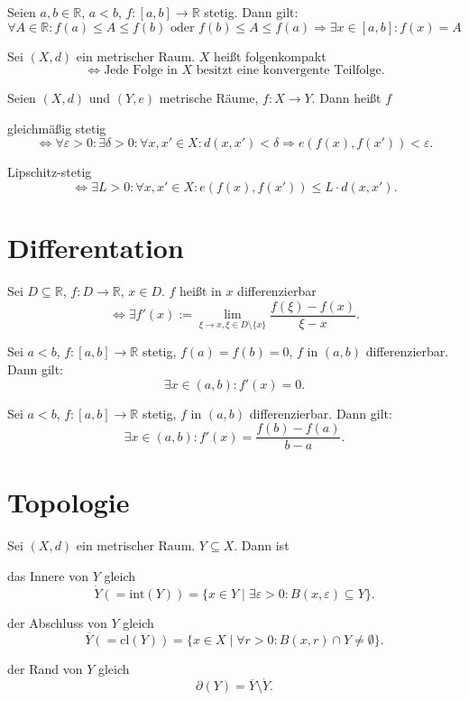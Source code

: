 \documentclass[]{scrartcl}
\newcommand{\R}{\ensuremath{\mathbb{R}}}
\begin{document}
\begin{satz}[Zwischenwertsatz]
Seien $a,b\in\R$, $a<b$, $f\colon \left[a,b\right]\to\R$ stetig. Dann gilt:
\[\forall A\in\R\colon f(a)\leq A\leq f(b)\text{ oder } f(b)\leq A\leq f(a) \Rightarrow \exists x\in\left[a,b\right]\colon f(x)=A\]
\end{satz}

\begin{definition}[Folgenkompakt]
Sei $(X,d)$ ein metrischer Raum. $X$ hei\ss t folgenkompakt
\[\Leftrightarrow\text{Jede Folge in $X$ besitzt eine konvergente Teilfolge.}\]
\end{definition}

\begin{definition}
Seien $(X,d)$ und $(Y,e)$ metrische R\"aume, $f\colon X\to Y$. Dann hei\ss t $f$

gleichm\"a\ss ig stetig
\[\Leftrightarrow\forall\varepsilon>0\colon \exists\delta>0\colon \forall x,x'\in X\colon d(x,x')<\delta\Rightarrow e(f(x),f(x'))<\varepsilon.\]

Lipschitz-stetig
\[\Leftrightarrow\exists L>0\colon \forall x,x'\in X\colon e(f(x),f(x'))\leq L\cdot d(x,x').\]
\end{definition}

\section*{Differentation}
\begin{definition}[Differenzierbar]
Sei $D\subseteq\R$, $f\colon D\to\R$, $x\in D$. $f$ hei\ss t in $x$ differenzierbar
\[\Leftrightarrow\exists f'(x):=\lim\limits_{\xi\to x,\xi\in D\setminus\{x\}}\frac{f(\xi)-f(x)}{\xi-x}.\]
\end{definition}

\begin{satz}
Sei $a<b$, $f\colon \left[a,b\right]\to\R$ stetig, $f(a)=f(b)=0$, $f$ in $(a,b)$ differenzierbar. Dann gilt:
\[\exists x\in(a,b)\colon f'(x)=0.\]
\end{satz}

\begin{satz}[Mittelwertsatz]
Sei $a<b$, $f\colon \left[a,b\right]\to\R$ stetig, $f$ in $(a,b)$ differenzierbar. Dann gilt:
\[\exists x\in(a,b)\colon f'(x)=\frac{f(b)-f(a)}{b-a}.\]
\end{satz}

\section*{Topologie}
\begin{definition}
Sei $(X,d)$ ein metrischer Raum. $Y\subseteq X$. Dann ist

das Innere von $Y$ gleich
\[\dot{Y}(=\text{int}(Y))=\{x\in Y\mid \exists\varepsilon>0\colon B(x,\varepsilon)\subseteq Y\}.\]

der Abschluss von $Y$ gleich
\[\overline{Y}(=\text{cl}(Y))=\{x\in X\mid \forall r>0\colon B(x,r)\cap Y\neq\emptyset\}.\]

der Rand von $Y$ gleich
\[\partial(Y)=\overline{Y}\setminus\dot{Y}.\]
\end{definition}
\end{document}
